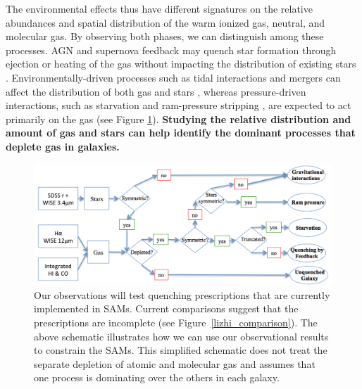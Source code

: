 \documentclass[11pt, preprint]{aastex}
\begin{document}
{The environmental effects thus
have different signatures on the relative abundances and spatial
distribution of the warm ionized gas, neutral, and molecular gas.  By
observing both 
phases, we can distinguish among these processes.}
AGN and supernova feedback may quench star formation through
ejection or heating of the gas without impacting the distribution of
existing stars \citep[e.g.][]{springel05,
  croton06, dekel06}.  Environmentally-driven processes 
such as tidal interactions and
mergers can
affect the distribution of both gas and stars \citep{springel05,
  croton06, dekel06}, whereas pressure-driven interactions, such as
starvation \citep{Larson80} and ram-pressure stripping
\citep[e.g.][]{Gunn72}, are expected to
act primarily on the gas (see Figure \ref{decisiontree}).  
{\bf Studying the relative distribution
and amount of gas and stars can help identify the dominant processes
that deplete gas in galaxies. }
 
\begin{figure}[h]
   \centering
\includegraphics[width=.9\textwidth]{decision_tree.png}
   \caption{\small Our observations will test quenching prescriptions that are currently implemented in SAMs.  Current comparisons suggest that the prescriptions are incomplete (see Figure~\ref{lizhi_comparison}).  The above schematic illustrates how we can use our observational results to constrain the SAMs.  This simplified schematic does not treat the separate depletion of atomic and molecular gas and assumes that one process is dominating over the others in each galaxy.}
     \label{decisiontree}
 \end{figure}
\end{document}
